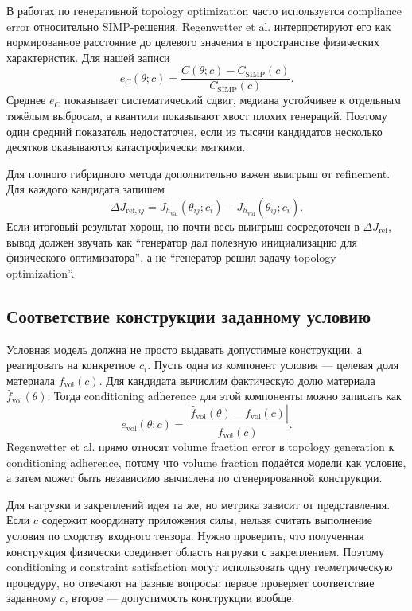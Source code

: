 В работах по генеративной topology optimization часто используется compliance error относительно SIMP-решения. Regenwetter et al. интерпретируют его как нормированное расстояние до целевого значения в пространстве физических характеристик. Для нашей записи
\begin{equation}
 e_C(\theta;c)
 =
 \frac{
  C(\theta;c)-C_{\mathrm{SIMP}}(c)
 }{
  C_{\mathrm{SIMP}}(c)
 }.
\end{equation}
Среднее $e_C$ показывает систематический сдвиг, медиана устойчивее к отдельным тяжёлым выбросам, а квантили показывают хвост плохих генераций. Поэтому один средний показатель недостаточен, если из тысячи кандидатов несколько десятков оказываются катастрофически мягкими.

Для полного гибридного метода дополнительно важен выигрыш от refinement. Для каждого кандидата запишем
\begin{equation}
 \Delta J_{\mathrm{ref},ij}
 =
 J_{h_{\mathrm{val}}}(\theta_{ij};c_i)
 -
 J_{h_{\mathrm{val}}}(\widetilde\theta_{ij};c_i).
\end{equation}
Если итоговый результат хорош, но почти весь выигрыш сосредоточен в $\Delta J_{\mathrm{ref}}$, вывод должен звучать как ``генератор дал полезную инициализацию для физического оптимизатора'', а не ``генератор решил задачу topology optimization''.

\subsection{Соответствие конструкции заданному условию}

Условная модель должна не просто выдавать допустимые конструкции, а реагировать на конкретное $c_i$. Пусть одна из компонент условия --- целевая доля материала $f_{\mathrm{vol}}(c)$. Для кандидата вычислим фактическую долю материала $\widehat f_{\mathrm{vol}}(\theta)$. Тогда conditioning adherence для этой компоненты можно записать как
\begin{equation}
 e_{\mathrm{vol}}(\theta;c)
 =
 \frac{
  \left|
   \widehat f_{\mathrm{vol}}(\theta)
   -f_{\mathrm{vol}}(c)
  \right|
 }{
  f_{\mathrm{vol}}(c)
 }.
\end{equation}
Regenwetter et al. прямо относят volume fraction error в topology generation к conditioning adherence, потому что volume fraction подаётся модели как условие, а затем может быть независимо вычислена по сгенерированной конструкции.

Для нагрузки и закреплений идея та же, но метрика зависит от представления. Если $c$ содержит координату приложения силы, нельзя считать выполнение условия по сходству входного тензора. Нужно проверить, что полученная конструкция физически соединяет область нагрузки с закреплением. Поэтому conditioning и constraint satisfaction могут использовать одну геометрическую процедуру, но отвечают на разные вопросы: первое проверяет соответствие заданному $c$, второе --- допустимость конструкции вообще.

